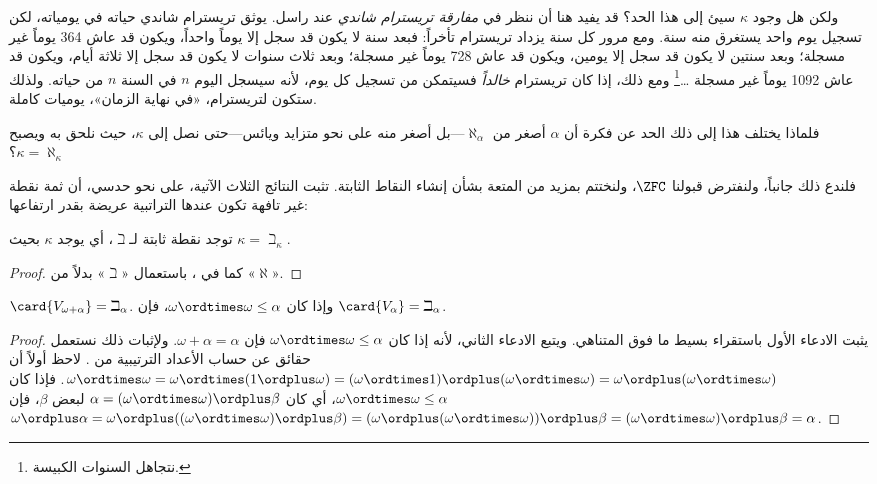 \documentclass[../../../include/open-logic-section]{subfiles}
\begin{document}
ولكن هل وجود $\kappa$ سيئ إلى هذا الحد؟ قد يفيد هنا أن ننظر في
\emph{مفارقة تريسترام شاندي} عند راسل. يوثق تريسترام شاندي حياته في
يومياته، لكن تسجيل يوم واحد يستغرق منه سنة. ومع مرور كل سنة يزداد
تريسترام تأخراً: فبعد سنة لا يكون قد سجل إلا يوماً واحداً، ويكون قد عاش
364 يوماً غير مسجلة؛ وبعد سنتين لا يكون قد سجل إلا يومين، ويكون قد عاش
728 يوماً غير مسجلة؛ وبعد ثلاث سنوات لا يكون قد سجل إلا ثلاثة أيام،
ويكون قد عاش 1092 يوماً غير مسجلة
\dots\footnote{نتجاهل السنوات الكبيسة.} ومع ذلك، إذا كان تريسترام
\emph{خالداً} فسيتمكن من تسجيل كل يوم، لأنه سيسجل اليوم $n$ في السنة
$n$ من حياته. ولذلك ستكون لتريسترام، «في نهاية الزمان»، يوميات كاملة.

فلماذا يختلف هذا إلى ذلك الحد عن فكرة أن $\alpha$ أصغر من
$\aleph_\alpha$---بل أصغر منه على نحو متزايد ويائس---حتى نصل إلى
$\kappa$، حيث نلحق به ويصبح $\kappa = \aleph_\kappa$؟

فلندع ذلك جانباً، ولنفترض قبولنا $\ZFC$، ولنختتم بمزيد من المتعة بشأن
إنشاء النقاط الثابتة. تثبت النتائج الثلاث الآتية، على نحو حدسي، أن ثمة
نقطة غير تافهة تكون عندها التراتبية عريضة بقدر ارتفاعها:

\begin{prop}
توجد نقطة ثابتة لـ$\beth$، أي يوجد $\kappa$ بحيث
$\kappa= \beth_\kappa$.
\end{prop}

\begin{proof}
كما في ، باستعمال «$\beth$» بدلاً من «$\aleph$».
\end{proof}

\begin{prop}
$\card{V_{\omega+\alpha}} = \beth_{\alpha}$. وإذا كان
$\omega \ordtimes \omega \leq \alpha$، فإن
$\card{V_\alpha} = \beth_\alpha$.
\end{prop}

\begin{proof}
يثبت الادعاء الأول باستقراء بسيط ما فوق المتناهي. ويتبع الادعاء الثاني،
لأنه إذا كان $\omega \ordtimes \omega \leq \alpha$ فإن
$\omega + \alpha = \alpha$. ولإثبات ذلك نستعمل حقائق عن حساب الأعداد
الترتيبية من . لاحظ أولاً أن
$\omega \ordtimes \omega = \omega \ordtimes (1 \ordplus \omega) =
(\omega \ordtimes 1) \ordplus (\omega\ordtimes\omega) = \omega
\ordplus (\omega \ordtimes \omega)$. فإذا كان
$\omega \ordtimes \omega \leq \alpha$، أي كان
$\alpha = (\omega\ordtimes\omega) \ordplus \beta$ لبعض $\beta$، فإن
$\omega \ordplus \alpha = \omega \ordplus
((\omega \ordtimes \omega) \ordplus \beta) =
(\omega \ordplus (\omega \ordtimes \omega)) \ordplus \beta =
(\omega \ordtimes \omega) \ordplus \beta = \alpha$.
\end{proof}
\end{document}
